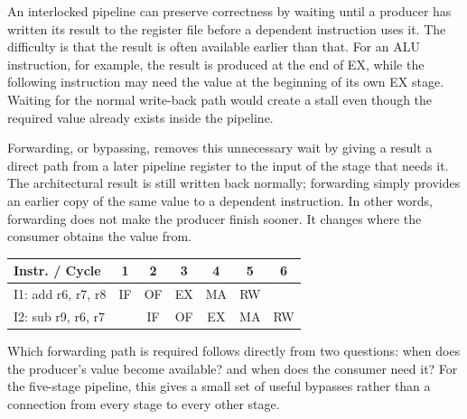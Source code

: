 \documentclass[12pt,a4paper]{report}
\begin{document}
An interlocked pipeline can preserve correctness by waiting until a producer has written its result to the register file before a dependent instruction uses it. The difficulty is that the result is often available earlier than that. For an ALU instruction, for example, the result is produced at the end of EX, while the following instruction may need the value at the beginning of its own EX stage. Waiting for the normal write-back path would create a stall even though the required value already exists inside the pipeline.

Forwarding, or bypassing, removes this unnecessary wait by giving a result a direct path from a later pipeline register to the input of the stage that needs it. The architectural result is still written back normally; forwarding simply provides an earlier copy of the same value to a dependent instruction. In other words, forwarding does not make the producer finish sooner. It changes where the consumer obtains the value from.

\begin{center}
\begin{tabular}{lcccccc}
\toprule
Instr. / Cycle & 1 & 2 & 3 & 4 & 5 & 6 \\
\midrule
I1: add r6, r7, r8 & IF & OF & EX & MA & RW & \\
I2: sub r9, r6, r7 & & IF & OF & EX & MA & RW \\
\bottomrule
\end{tabular}
\end{center}

Which forwarding path is required follows directly from two questions: when does the producer's value become available? and when does the consumer need it? For the five-stage pipeline, this gives a small set of useful bypasses rather than a connection from every stage to every other stage.

\begin{center}
\end{center}
\end{document}
